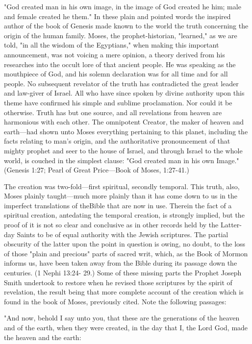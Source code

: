 "God created man in his own image, in the image of God created he him; male and female
created he them." In these plain and pointed words the inspired author of the book of Genesis
made known to the world the truth concerning the origin of the human family. Moses, the
prophet-historian, "learned," as we are told, "in all the wisdom of the Egyptians," when
making this important announcement, was not voicing a mere opinion, a theory derived from
his researches into the occult lore of that ancient people. He was speaking as the mouthpiece
of God, and his solemn declaration was for all time and for all people. No subsequent
revelator of the truth has contradicted the great leader and law-giver of Israel. All who have
since spoken by divine authority upon this theme have confirmed his simple and sublime
proclamation. Nor could it be otherwise. Truth has but one source, and all revelations from
heaven are harmonious with each other. The omnipotent Creator, the maker of heaven and
earth—had shown unto Moses everything pertaining to this planet, including the facts
relating to man's origin, and the authoritative pronouncement of that mighty prophet and seer
to the house of Israel, and through Israel to the whole world, is couched in the simplest
clause: "God created man in his own Image." (Genesis 1:27; Pearl of Great Price—Book of
Moses, 1:27-41.)

The creation was two-fold—first spiritual, secondly temporal. This truth, also, Moses plainly
taught—much more plainly than it has come down to us in the imperfect translations of theBible that are now in use. Therein the fact of a spiritual creation, antedating the temporal
creation, is strongly implied, but the proof of it is not so clear and conclusive as in other
records held by the Latter-day Saints to be of equal authority with the Jewish scriptures. The
partial obscurity of the latter upon the point in question is owing, no doubt, to the loss of
those "plain and precious" parts of sacred writ, which, as the Book of Mormon informs us,
have been taken away from the Bible during its passage down the centuries. (1 Nephi 13:24-
29.) Some of these missing parts the Prophet Joseph Smith undertook to restore when he
revised those scriptures by the spirit of revelation, the result being that more complete
account of the creation which is found in the book of Moses, previously cited. Note the
following passages:

"And now, behold I say unto you, that these are the generations of the heaven and of the
earth, when they were created, in the day that I, the Lord God, made the heaven and the
earth:

